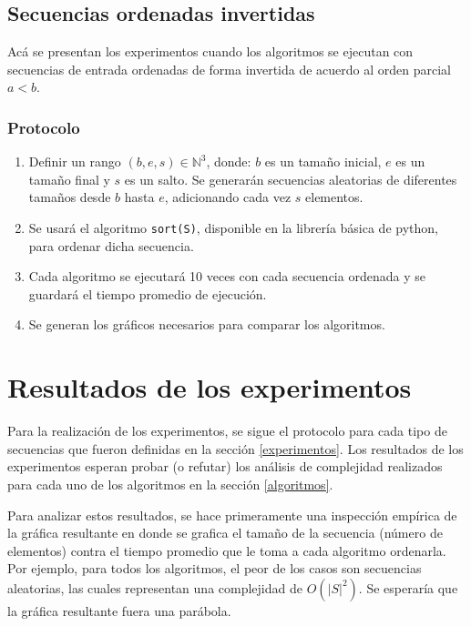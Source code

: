 \documentclass[letter]{article}
\begin{document}
\subsection{Secuencias ordenadas invertidas} \label{experimentos:invertidas}

Acá se presentan los experimentos cuando los algoritmos se ejecutan con secuencias de entrada ordenadas de forma invertida de acuerdo al orden parcial $a<b$.

\subsubsection{Protocolo}
\begin{enumerate}
    \item Definir un rango $(b,e,s)\in\mathbb{N}^3$, donde: $b$ es un tamaño inicial, $e$ es un tamaño final y $s$ es un salto. Se generarán secuencias aleatorias de diferentes tamaños desde $b$ hasta $e$, adicionando cada vez $s$ elementos.
    \item Se usará el algoritmo \texttt{sort(S)}, disponible en la librería básica de python, para ordenar dicha secuencia.
    \item Cada algoritmo se ejecutará 10 veces con cada secuencia ordenada y se guardará el tiempo promedio de ejecución.
    \item Se generan los gráficos necesarios para comparar los algoritmos.
\end{enumerate}

\section{Resultados de los experimentos} \label{resultados}

Para la realización de los experimentos, se sigue el protocolo para cada tipo de secuencias que fueron definidas en la sección \ref{experimentos}. Los resultados de los experimentos esperan probar (o refutar) los análisis de complejidad realizados para cada uno de los algoritmos en la sección \ref{algoritmos}. \par

Para analizar estos resultados, se hace primeramente una inspección empírica de la gráfica resultante en donde se grafica el tamaño de la secuencia (número de elementos) contra el tiempo promedio que le toma a cada algoritmo ordenarla. Por ejemplo, para todos los algoritmos, el peor de los casos son secuencias aleatorias, las cuales representan una complejidad de $O(|S|^2)$. Se esperaría que la gráfica resultante fuera una parábola. \par
\end{document}
